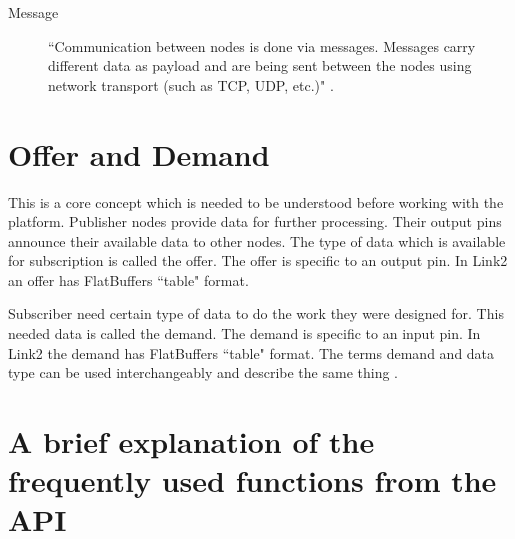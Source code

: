 \documentclass[a4paper, 12pt, oneside]{report}
\begin{document}
\begin{description}
    \item [Message] ``Communication between nodes is done via messages. Messages carry different data as payload and are being sent between the nodes using network transport (such as TCP, UDP, etc.)" \cite{CorecomponentsDRAIVELinkDocumentation-2019-12-09}.

  \end{description}

  \vspace{0.1cm}
  
  \section{Offer and Demand}
  This is a core concept which is needed to be understood before working with the platform.
  Publisher nodes provide data for further processing. Their output pins announce their available data to other nodes. The type of data which is available for subscription is called the offer. The offer is specific to an output pin. In Link2 an offer has FlatBuffers ``table" format.
  
  Subscriber need certain type of data to do the work they were designed for. This needed data is called the demand. The demand is specific to an input pin. In Link2 the demand has FlatBuffers \cite{FlatBuffersFlatBuffers-2019-06-20} ``table" format. The terms demand and data type can be used interchangeably and describe the same thing \cite{PinsDRAIVELinkDocumentation-2019-12-09}.
  
  \section{A brief explanation of the frequently used functions from the API}
  
\end{document}
